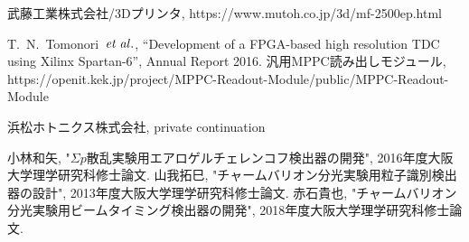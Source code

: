 \begin{thebibliography}{99}
   武藤工業株式会社/3Dプリンタ, https://www.mutoh.co.jp/3d/mf-2500ep.html
  
   T.~N.~Tomonori~${\it et\;al.}$, “Development of a FPGA-based high resolution TDC using Xilinx Spartan-6”, Annual Report 2016.
   汎用MPPC読み出しモジュール, https://openit.kek.jp/project/MPPC-Readout-Module/public/MPPC-Readout-Module
  
   浜松ホトニクス株式会社, private continuation
  
   小林和矢, "$\Sigma p$散乱実験用エアロゲルチェレンコフ検出器の開発", 2016年度大阪大学理学研究科修士論文.
   山我拓巳, "チャームバリオン分光実験用粒子識別検出器の設計", 2013年度大阪大学理学研究科修士論文.
   赤石貴也, "チャームバリオン分光実験用ビームタイミング検出器の開発", 2018年度大阪大学理学研究科修士論文.
  
  \end{thebibliography}
  
  
  